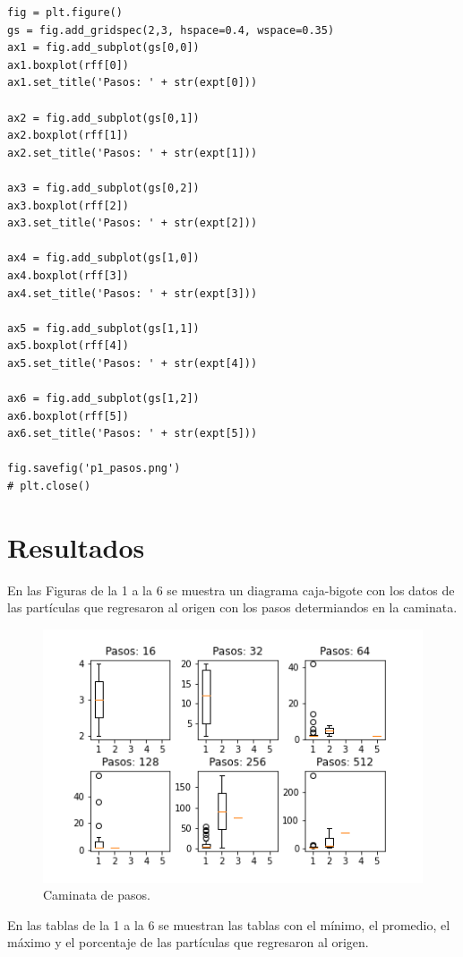 \documentclass{article}
\begin{document}
\begin{verbatim}
fig = plt.figure()
gs = fig.add_gridspec(2,3, hspace=0.4, wspace=0.35)
ax1 = fig.add_subplot(gs[0,0])
ax1.boxplot(rff[0])
ax1.set_title('Pasos: ' + str(expt[0]))

ax2 = fig.add_subplot(gs[0,1])
ax2.boxplot(rff[1])
ax2.set_title('Pasos: ' + str(expt[1]))
                      
ax3 = fig.add_subplot(gs[0,2])
ax3.boxplot(rff[2])
ax3.set_title('Pasos: ' + str(expt[2]))

ax4 = fig.add_subplot(gs[1,0])
ax4.boxplot(rff[3])
ax4.set_title('Pasos: ' + str(expt[3]))

ax5 = fig.add_subplot(gs[1,1])
ax5.boxplot(rff[4])
ax5.set_title('Pasos: ' + str(expt[4]))

ax6 = fig.add_subplot(gs[1,2])
ax6.boxplot(rff[5])
ax6.set_title('Pasos: ' + str(expt[5]))

fig.savefig('p1_pasos.png')
# plt.close()
\end{verbatim}
\newpage
\section{Resultados}
En las Figuras de la 1 a la 6 se muestra un diagrama caja-bigote con los datos de las partículas que regresaron al origen con los pasos determiandos en la caminata.

\begin{figure}[H]
\centering
\includegraphics[width=120mm]{p1_pasos.png}
\caption{\label{fig1}Caminata de pasos.}
\end{figure}


En las tablas de la 1 a la 6 se muestran las tablas con el mínimo, el promedio, el máximo y el porcentaje de las partículas que regresaron al origen.\\
\end{document}
